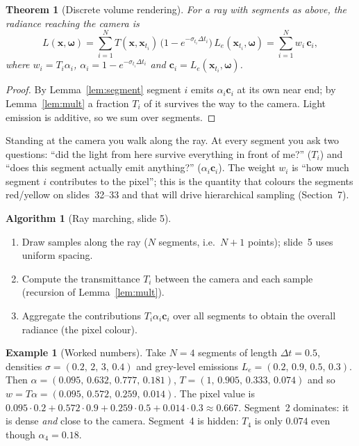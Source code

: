 \documentclass[11pt,a4paper]{article}
\newcommand{\xx}{\boldsymbol{x}}
\newcommand{\om}{\boldsymbol{\omega}}
\newcommand{\cc}{\boldsymbol{c}}
\newcommand{\Le}{L_e}
\theoremstyle{definition}
\newtheorem{example}{Example}[section]
\newtheorem{algorithm}{Algorithm}[section]
\theoremstyle{plain}
\newtheorem{theorem}{Theorem}[section]
\begin{document}
\begin{theorem}[Discrete volume rendering]\label{thm:render}
For a ray with segments as above, the radiance reaching the camera is
\[
L(\xx,\om)=\sum_{i=1}^{N}T(\xx,\xx_{t_i})\,\big(1-e^{-\sigma_{t_i}\Delta t_i}\big)\,\Le(\xx_{t_i},\om)
=\sum_{i=1}^{N}w_i\,\cc_i,
\]
where $w_i=T_i\alpha_i$, $\alpha_i=1-e^{-\sigma_{t_i}\Delta t_i}$ and $\cc_i=\Le(\xx_{t_i},\om)$.
\end{theorem}
\begin{proof}
By Lemma~\ref{lem:segment} segment $i$ emits $\alpha_i\cc_i$ at its own near end; by Lemma~\ref{lem:mult} a fraction $T_i$ of it survives the way to the camera. Light emission is additive, so we sum over segments.
\end{proof}

\begin{intuition}
Standing at the camera you walk along the ray. At every segment you ask two questions: ``did the light from here survive everything in front of me?'' ($T_i$) and ``does this segment actually emit anything?'' ($\alpha_i\cc_i$). The weight $w_i$ is ``how much segment $i$ contributes to the pixel''; this is the quantity that colours the segments red/yellow on slides~32--33 and that will drive hierarchical sampling (Section~7).
\end{intuition}

\begin{algorithm}[Ray marching, slide 5]\label{alg:march}
\begin{enumerate}[nosep]
\item Draw samples along the ray ($N$ segments, i.e.\ $N+1$ points); slide~5 uses uniform spacing.
\item Compute the transmittance $T_i$ between the camera and each sample (recursion of Lemma~\ref{lem:mult}).
\item Aggregate the contributions $T_i\alpha_i\cc_i$ over all segments to obtain the overall radiance (the pixel colour).
\end{enumerate}
\end{algorithm}

\begin{example}[Worked numbers]\label{ex:toy}
Take $N=4$ segments of length $\Delta t=0.5$, densities $\sigma=(0.2,\,2,\,3,\,0.4)$ and grey-level emissions $\Le=(0.2,\,0.9,\,0.5,\,0.3)$.
Then $\alpha=(0.095,\,0.632,\,0.777,\,0.181)$, $T=(1,\,0.905,\,0.333,\,0.074)$ and so $w=T\alpha=(0.095,\,0.572,\,0.259,\,0.014)$. The pixel value is
$0.095\cdot0.2+0.572\cdot0.9+0.259\cdot0.5+0.014\cdot0.3\approx0.667$.
Segment~2 dominates: it is dense \emph{and} close to the camera. Segment~4 is hidden: $T_4$ is only $0.074$ even though $\alpha_4=0.18$.
\end{example}
\end{document}
